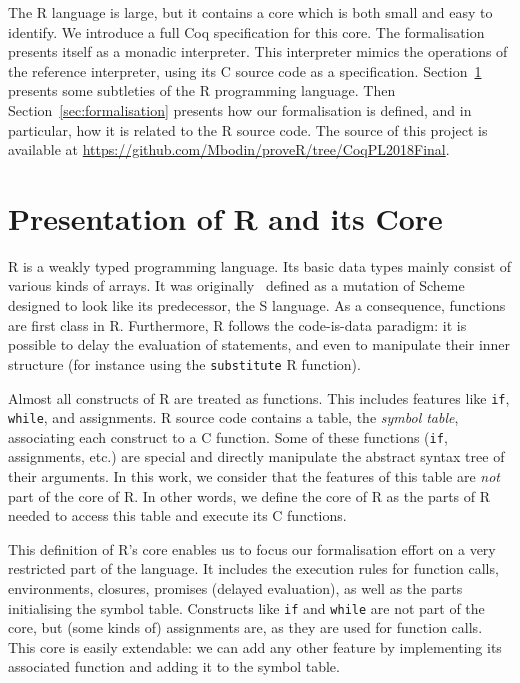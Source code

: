 \documentclass[9pt, sigplan, natbib=false, screen=true]{acmart}
\newcommand\Coq{Coq}
\newcommand\R{R}
\newcommand\Cn{C}
\begin{document}
The \R{} language is large,
but it contains a core which is both small and easy to identify.
We introduce a full \Coq{} specification for this core.
The formalisation presents itself as a monadic interpreter.
This interpreter mimics the operations of the reference interpreter,
using its \Cn{} source code as a specification.
%
Section~\ref{sec:presentation} presents some subtleties of the \R{} programming language.
Then Section~\ref{sec:formalisation} presents how our formalisation is defined,
and in particular, how it is related to the \R{} source code.
The source of this project is available at \url{https://github.com/Mbodin/proveR/tree/CoqPL2018Final}.


\section{Presentation of \R{} and its Core}
\label{sec:presentation}

\R{} is a weakly typed programming language.
Its basic data types mainly consist of various kinds of arrays.
It was originally~\parencite{ihaka1996r} defined as a mutation of Scheme
designed to look like its predecessor,
the S language.
As a consequence, functions are first class in \R{}.
Furthermore, \R{} follows the code-is-data paradigm:
it is possible to delay the evaluation of statements,
and even to manipulate their inner structure
(for instance using the \texttt{substitute} \R{} function).

Almost all constructs of \R{} are treated as functions.
This includes features like \texttt{if}, \texttt{while},
and assignments.
\R{} source code contains a table,
the \emph{symbol table},
associating each construct to a \Cn{} function.
Some of these functions (\texttt{if}, assignments, etc.)
are special and directly manipulate the abstract syntax tree
of their arguments.
%
In this work,
we consider that the features of this table
are \emph{not} part of the core of \R{}.
In other words, we define the core of \R{}
as the parts of \R{} needed to access this table
and execute its \Cn{} functions.

This definition of \R{}'s core enables us to focus
our formalisation effort on a very restricted part of the language.
It includes the execution rules for function calls,
environments, closures, promises (delayed evaluation),
as well as the parts initialising the symbol table.
Constructs like \texttt{if} and \texttt{while}
are not part of the core,
but (some kinds of) assignments are,
as they are used for function calls.
This core is easily extendable:
we can add any other feature by implementing
its associated function
and adding it to the symbol table.
\end{document}
